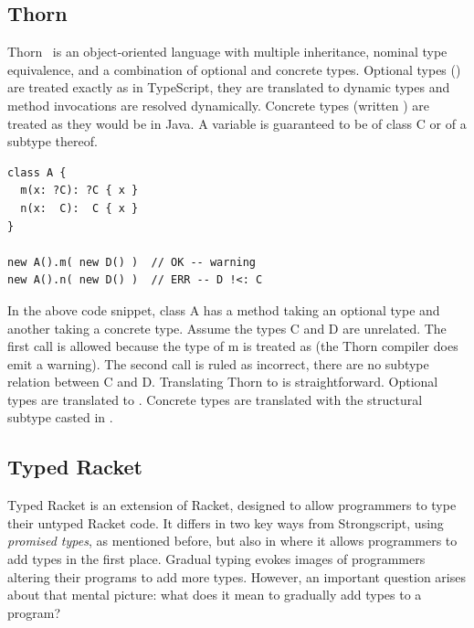 \documentclass[a4paper,USenglish]{tex/lipics-v2016}
\begin{document}
\subsection{Thorn}

Thorn~\cite{oopsla09} is an object-oriented language with multiple
inheritance, nominal type equivalence, and a combination of optional and
concrete types. Optional types () are treated exactly
as in TypeScript, they are translated to dynamic types and method invocations are
resolved dynamically. Concrete types (written ) are treated as they would be in Java. 
A variable  is guaranteed to be of class \code C or of a subtype thereof.

\begin{lstlisting}
class A {
  m(x: ?C): ?C { x }
  n(x:  C):  C { x }
}

new A().m( new D() )  // OK -- warning
new A().n( new D() )  // ERR -- D !<: C
\end{lstlisting}

In the above code snippet, class \code A has a method taking an optional
type and another taking a concrete type. Assume the types \code C and \code D are
unrelated. The first call is allowed because the type of \code m is treated
as \any (the Thorn compiler does emit a warning). The second call is ruled
as incorrect, there are no subtype relation between \code C and \code D.
Translating Thorn to \kafka is straightforward. Optional types are translated
to \any. Concrete types are translated with the structural subtype casted
in \kafka. 


\subsection{Typed Racket}

Typed Racket is an extension of Racket, designed to allow programmers to
type their untyped Racket code. It differs in two key ways from
Strongscript, using \emph{promised types}, as mentioned before, but also in
where it allows programmers to add types in the first place. Gradual typing
evokes images of programmers altering their programs to add more
types. However, an important question arises about that mental picture: what
does it mean to gradually add types to a program?
\end{document}
